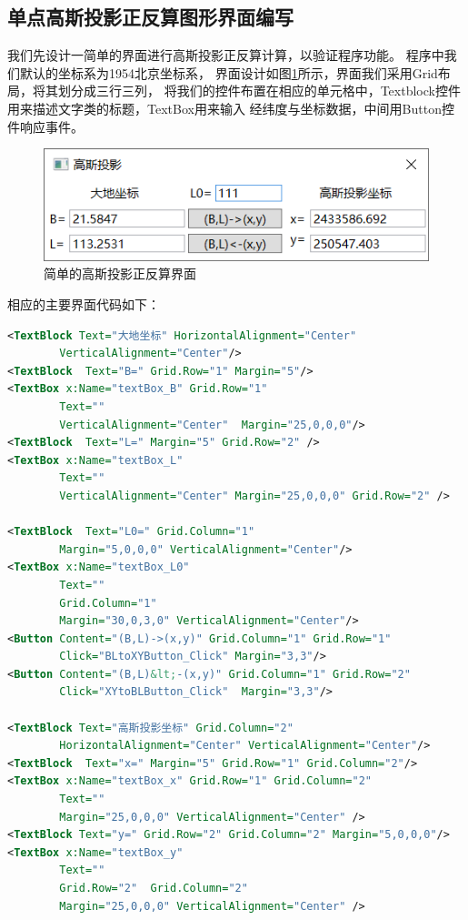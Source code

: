 \subsection{单点高斯投影正反算图形界面编写}
我们先设计一简单的界面进行高斯投影正反算计算，以验证程序功能。
程序中我们默认的坐标系为1954北京坐标系，
界面设计如图\ref{fig:GaussProjUI01}所示，界面我们采用Grid布局，将其划分成三行三列，
将我们的控件布置在相应的单元格中，Textblock控件用来描述文字类的标题，TextBox用来输入
经纬度与坐标数据，中间用Button控件响应事件。

\begin{figure}[htbp]
    \centering
    \includegraphics[scale=1]{gaussProj/UI01.png}
    \caption{简单的高斯投影正反算界面}
    \label{fig:GaussProjUI01}
\end{figure}

相应的主要界面代码如下：

\begin{lstlisting}[language=xml]
<TextBlock Text="大地坐标" HorizontalAlignment="Center"
        VerticalAlignment="Center"/>
<TextBlock  Text="B=" Grid.Row="1" Margin="5"/>
<TextBox x:Name="textBox_B" Grid.Row="1"
        Text=""
        VerticalAlignment="Center"  Margin="25,0,0,0"/>
<TextBlock  Text="L=" Margin="5" Grid.Row="2" />
<TextBox x:Name="textBox_L"
        Text=""
        VerticalAlignment="Center" Margin="25,0,0,0" Grid.Row="2" />

<TextBlock  Text="L0=" Grid.Column="1"
        Margin="5,0,0,0" VerticalAlignment="Center"/>
<TextBox x:Name="textBox_L0"
        Text=""
        Grid.Column="1"
        Margin="30,0,3,0" VerticalAlignment="Center"/>
<Button Content="(B,L)->(x,y)" Grid.Column="1" Grid.Row="1"
		Click="BLtoXYButton_Click" Margin="3,3"/>
<Button Content="(B,L)&lt;-(x,y)" Grid.Column="1" Grid.Row="2"
		Click="XYtoBLButton_Click"  Margin="3,3"/>
        
<TextBlock Text="高斯投影坐标" Grid.Column="2"
		HorizontalAlignment="Center" VerticalAlignment="Center"/>
<TextBlock  Text="x=" Margin="5" Grid.Row="1" Grid.Column="2"/>
<TextBox x:Name="textBox_x" Grid.Row="1" Grid.Column="2"
		Text=""
		Margin="25,0,0,0" VerticalAlignment="Center" />
<TextBlock Text="y=" Grid.Row="2" Grid.Column="2" Margin="5,0,0,0"/>
<TextBox x:Name="textBox_y"
		Text=""
		Grid.Row="2"  Grid.Column="2"
		Margin="25,0,0,0" VerticalAlignment="Center" />       
\end{lstlisting}

